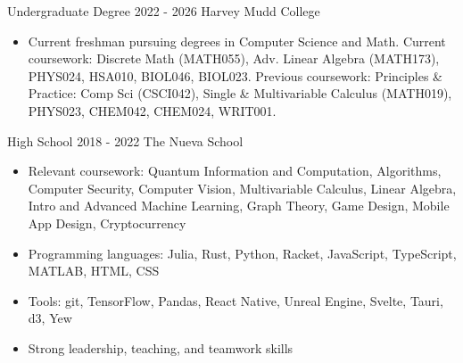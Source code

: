 \documentclass[9pt]{resume}
\begin{document}
    \vspace{-0.4cm}
    \begin{experiencelist}
        \experience 
            {Undergraduate Degree}
            {2022 - 2026}
            {Harvey Mudd College}
            {\begin{itemize}[noitemsep, topsep=1pt]
                \item[] {Current freshman pursuing degrees in Computer Science and Math. Current coursework: Discrete Math (MATH055), Adv. Linear Algebra (MATH173), PHYS024, HSA010, BIOL046, BIOL023. Previous coursework: Principles \& Practice: Comp Sci (CSCI042), Single \& Multivariable Calculus (MATH019), PHYS023, CHEM042, CHEM024, WRIT001.}
            \end{itemize}}
        \experience
            {High School}
            {2018 - 2022}
            {The Nueva School}
            {\begin{itemize}[noitemsep, topsep=1pt]
                \item[] Relevant coursework: Quantum Information and Computation, Algorithms, Computer Security, Computer Vision, Multivariable Calculus, Linear Algebra, Intro and Advanced Machine Learning, Graph Theory, Game Design, Mobile App Design, Cryptocurrency
            \end{itemize}}
    \end{experiencelist}
    \vspace{-0.4cm}
    \begin{itemize}[noitemsep, topsep=0pt]
        \item Programming languages: Julia, Rust, Python, Racket, JavaScript, TypeScript, MATLAB, HTML, CSS
        \item Tools: git, TensorFlow, Pandas, React Native, Unreal Engine, Svelte, Tauri, d3, Yew
        \item Strong leadership, teaching, and teamwork skills
    \end{itemize}
\end{document}
